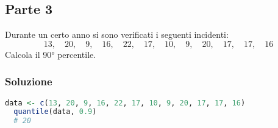 \documentclass[a4paper]{article}
\theoremstyle{break}
\theoremstyle{break}
\theoremstyle{break}
\theoremstyle{break}
\begin{document}
\subsection{Parte 3}
Durante un certo anno si sono verificati i seguenti incidenti:
\[
13, \quad 20, \quad 9, \quad 16, \quad 22, \quad 17, \quad 10, \quad 9, \quad 20, \quad 17, \quad 17, \quad 16
\] 
Calcola il 90° percentile.

\subsubsection{Soluzione}
\begin{lstlisting}[language=R]
  data <- c(13, 20, 9, 16, 22, 17, 10, 9, 20, 17, 17, 16)
  quantile(data, 0.9)
  # 20
\end{lstlisting}
\end{document}
